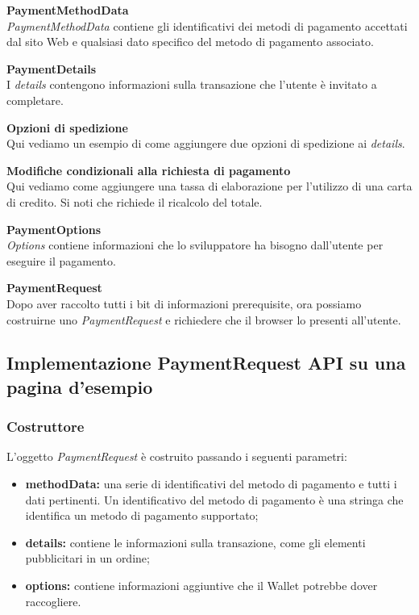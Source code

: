 \documentclass[11pt ,a4paper , twoside , openright ]{article}
\begin{document}
\pagebreak
\textbf{PaymentMethodData}
\\
\textit{PaymentMethodData} \cite{rif11} contiene gli identificativi dei metodi di pagamento accettati dal sito Web e qualsiasi dato specifico del metodo di pagamento associato.

\textbf{PaymentDetails}
\\
I \textit{details} \cite{rif14} contengono informazioni sulla transazione che l'utente è invitato a completare.

\pagebreak
\textbf{Opzioni di spedizione}
\\
Qui vediamo un esempio di come aggiungere due opzioni di spedizione ai \textit{details}. \cite{rif16}


\flushleft\textbf{Modifiche condizionali alla richiesta di pagamento}
\\
Qui vediamo come aggiungere una tassa di elaborazione per l'utilizzo di una carta di credito. Si noti che richiede il ricalcolo del totale.

\pagebreak
\textbf{PaymentOptions} \\
\textit{Options} contiene informazioni che lo sviluppatore ha bisogno dall'utente per eseguire il pagamento.


\textbf{PaymentRequest} \\
Dopo aver raccolto tutti i bit di informazioni prerequisite, ora possiamo costruirne uno \textit{PaymentRequest} e richiedere che il browser lo presenti all'utente.



\subsection{Implementazione PaymentRequest API su una pagina d'esempio \cite{rif15}}
\subsubsection{Costruttore}
L'oggetto \textit{PaymentRequest} è costruito passando i seguenti parametri:
\begin{itemize}
	\item \textbf{methodData:} una serie di identificativi del metodo di pagamento e tutti i dati pertinenti. Un identificativo del metodo di pagamento è una stringa che identifica un metodo di pagamento supportato;
	\item \textbf{details:} contiene le informazioni sulla transazione, come gli elementi pubblicitari in un ordine;
	\item \textbf{options:} contiene informazioni aggiuntive che il Wallet potrebbe dover raccogliere.
\end{itemize}
\end{document}
